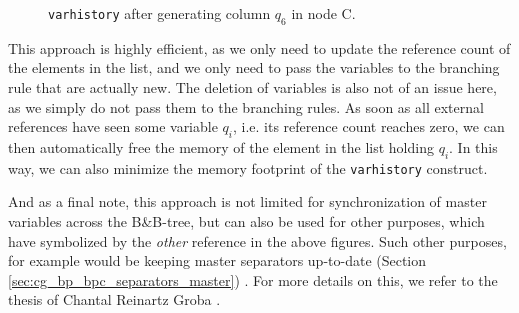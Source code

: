 \begin{figure}[H]
\centering
{}
\caption{\texttt{varhistory} after generating column $q_6$ in node C.}
\label{fig:gm_sync_history_generate_q6}
\end{figure}

This approach is highly efficient, as we only need to update the reference count of the elements in the list, and we only need to pass the variables to the branching rule that are actually new. The deletion of variables is also not of an issue here, as we simply do not pass them to the branching rules. As soon as all external references have seen some variable $q_i$, i.e. its reference count reaches zero, we can then automatically free the memory of the element in the list holding $q_i$. In this way, we can also minimize the memory footprint of the \texttt{varhistory} construct.

And as a final note, this approach is not limited for synchronization of master variables across the B\&B-tree, but can also be used for other purposes, which have symbolized by the \textit{other} reference in the above figures. Such other purposes, for example would be keeping master separators up-to-date (Section \ref{sec:cg_bp_bpc_separators_master}) . For more details on this, we refer to the thesis of Chantal Reinartz Groba \cite{TODO}.

